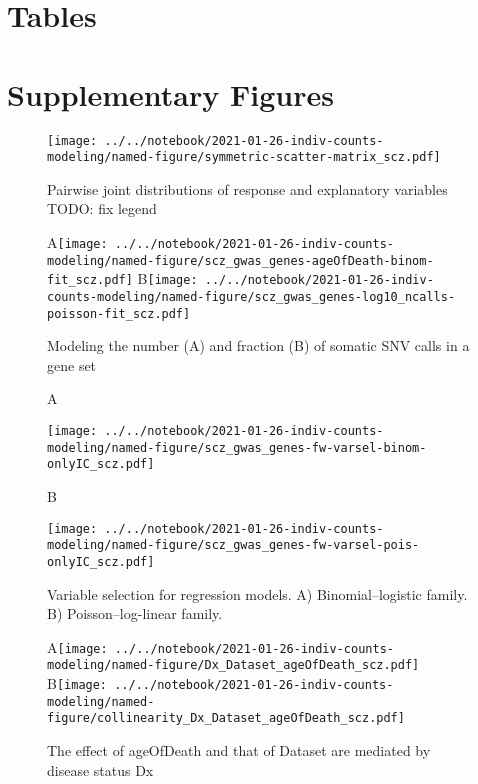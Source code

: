 \documentclass[letterpaper]{article}
\begin{document}
\section*{Tables}

\section*{Supplementary Figures}

\setcounter{figure}{0}
\makeatletter 
\renewcommand{\figurename}{Supplementary Figure} %
\makeatother

\begin{figure}[p]
\begin{center}
\texttt{[image: ../../notebook/2021-01-26-indiv-counts-modeling/named-figure/symmetric-scatter-matrix\_scz.pdf]}
\end{center}
\caption{
Pairwise joint distributions of response and explanatory variables TODO: fix legend
}
\label{fig:scattermatrix}
\end{figure}

\begin{figure}[p]
\begin{center}
A\texttt{[image: ../../notebook/2021-01-26-indiv-counts-modeling/named-figure/scz\_gwas\_genes-ageOfDeath-binom-fit\_scz.pdf]}
B\texttt{[image: ../../notebook/2021-01-26-indiv-counts-modeling/named-figure/scz\_gwas\_genes-log10\_ncalls-poisson-fit\_scz.pdf]}
\end{center}
\caption{
Modeling the number (A) and fraction (B) of somatic SNV calls in a gene set
}
\label{fig:fitted-lines}
\end{figure}

\begin{figure}[p]
\begin{center}
A

\texttt{[image: ../../notebook/2021-01-26-indiv-counts-modeling/named-figure/scz\_gwas\_genes-fw-varsel-binom-onlyIC\_scz.pdf]}

B

\texttt{[image: ../../notebook/2021-01-26-indiv-counts-modeling/named-figure/scz\_gwas\_genes-fw-varsel-pois-onlyIC\_scz.pdf]}
\end{center}
\caption{
Variable selection for regression models. A) Binomial--logistic
family.  B) Poisson--log-linear family.
}
\label{fig:varsel}
\end{figure}

\begin{figure}[p]
\begin{center}
A\texttt{[image: ../../notebook/2021-01-26-indiv-counts-modeling/named-figure/Dx\_Dataset\_ageOfDeath\_scz.pdf]}
B\texttt{[image: ../../notebook/2021-01-26-indiv-counts-modeling/named-figure/collinearity\_Dx\_Dataset\_ageOfDeath\_scz.pdf]}
\end{center}
\caption{
The effect of ageOfDeath and that of Dataset are mediated by disease status Dx
}
\label{fig:d-separation}
\end{figure}
\end{document}
